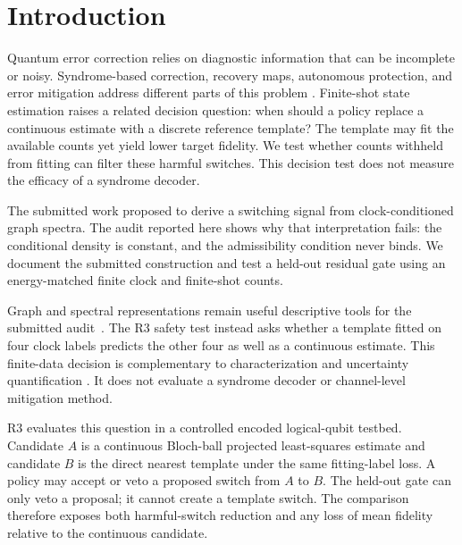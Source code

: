 \documentclass{iopjournal}
\begin{document}

\section{Introduction}\label{sec:introduction}

Quantum error correction relies on diagnostic information that can be
incomplete or noisy.  Syndrome-based correction, recovery maps, autonomous
protection, and error mitigation address different parts of this problem
\cite{Lautenbacher2024PetzRecoveryQudit,Gertler2021AutonomousQECBosonic,VanDenBerg2023SparsePauliLindbladPEC,Strikis2021LearningBasedQEM,Liao2024MachineLearningQEM}.
Finite-shot state estimation raises a related decision question: when should a
policy replace a continuous estimate with a discrete reference template?  The
template may fit the available counts yet yield lower target fidelity.  We test
whether counts withheld from fitting can filter these harmful switches.  This
decision test does not measure the efficacy of a syndrome decoder.

The submitted work proposed to derive a switching signal from clock-conditioned
graph spectra.  The audit reported here shows why that interpretation fails:
the conditional density is constant, and the admissibility condition never
binds.  We document the submitted construction and test a held-out residual
gate using an energy-matched finite clock and finite-shot counts.

Graph and spectral representations remain useful descriptive tools for the
submitted audit~\cite{Braunstein2006GraphLaplacianDensityMatrix,Adhikari2017WeightedDigraphsQuantumStates,Biamonte2019ComplexNetworksQuantum}.
The R3 safety test instead asks whether a template fitted on four clock labels
predicts the other four as well as a continuous estimate.  This finite-data
decision is complementary to characterization and uncertainty quantification
\cite{Hashim2025BenchmarkingCharacterization,Cieslinski2024RandomisedMeasurements,Bennink2026UncertaintyQuantificationQC}.
It does not evaluate a syndrome decoder or channel-level mitigation method.

R3 evaluates this question in a controlled encoded logical-qubit testbed.
Candidate \(A\) is a continuous Bloch-ball projected least-squares estimate and
candidate \(B\) is the direct nearest template under the same fitting-label
loss.  A policy may accept or veto a proposed switch from \(A\) to \(B\).  The
held-out gate can only veto a proposal; it cannot create a template switch.  The
comparison therefore exposes both harmful-switch reduction and any loss of mean
fidelity relative to the continuous candidate.
\end{document}
